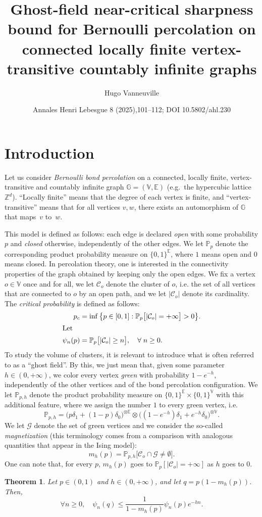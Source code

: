 \documentclass[10pt]{amsart}
\title[Ghost-field near-critical sharpness]{Ghost-field near-critical sharpness bound for Bernoulli percolation on connected locally finite vertex-transitive countably infinite graphs}
\author{Hugo Vanneuville}
\date{Annales Henri Lebesgue 8 (2025),101–112; DOI 10.5802/ahl.230}
\newtheorem{theo}{Theorem}[section]
\theoremstyle{definition}
\newcommand{\E}{\mathbb{E}}
\newcommand{\G}{\mathbb{G}}
\newcommand{\V}{\mathbb{V}}
\newcommand{\Z}{\mathbb{Z}}
\newcommand{\Pro}{\mathbb{P}}
\newcommand{\calC}{\mathcal{C}}
\newcommand{\calG}{\mathcal{G}}
\let\oldforall\forall
\renewcommand*{\forall}{\mathrel{\oldforall}}
\begin{document}
\maketitle
\section{Introduction}

Let us consider \emph{Bernoulli bond percolation} on a connected, locally finite, vertex-transitive and countably infinite graph $\G=(\V,\E)$ (e.g.\ the hypercubic lattice $\Z^d$). ``Locally finite'' means that the degree of each vertex is finite, and ``vertex-transitive'' means that for all vertices $v,w$, there exists an automorphism of $\G$ that maps~$v$ to~$w$.


This model is defined as follows: each edge is declared \emph{open} with some probability $p$ and \emph{closed} otherwise, independently of the other edges. We let $\Pro_p$ denote the corresponding product probability measure on $\{0,1\}^{\E}$, where $1$ means open and $0$ means closed. In percolation theory, one is interested in the connectivity properties of the graph obtained by keeping only the open edges. We fix a vertex $o \in \V$ once and for all, we let $\calC_o$ denote the cluster of $o$, i.e. the set of all vertices that are connected to $o$ by an open path, and we let $|\calC_o|$ denote its cardinality. The \emph{critical probability} is defined as follows:
\begin{align*}
p_c &= \inf \big\{ p \in [0,1] : \Pro_p\big[|\calC_o|=+\infty\big]>0 \big\}.
\\
\intertext{Let}
\psi_n(p) &= \Pro_p\big[|\calC_o| \ge n\big], \quad \forall n \ge 0.
\end{align*}
To study the volume of clusters, it is relevant to introduce what is often referred to as a ``ghost field''. By this, we just mean that, given some parameter $h \in (0,+\infty)$, we color every vertex \emph{green} with probability $1-e^{-h}$, independently of the other vertices and of the bond percolation configuration. We let $\Pro_{p,h}$ denote the product probability measure on $\{0,1\}^{\E} \times \{0,1\}^{\V}$ with this additional feature, where we assign the number $1$ to every green vertex, i.e.
\[
\Pro_{p,h} = \big(p\delta_1+(1-p)\delta_0\big)^{\otimes \E} \otimes \big((1-e^{-h})\delta_1+e^{-h}\delta_0\big)^{\otimes \V}.
\]
We let $\calG$ denote the set of green vertices and we consider the so-called \emph{magnetization} (this terminology comes from a comparison with analogous quantities that appear in the Ising model):
\[
m_h(p)=\Pro_{p,h} \big[\calC_o \cap \calG \ne \emptyset \big].
\]
One can note that, for every $p$, $m_h(p)$ goes to $\Pro_p[|\calC_o|=+\infty]$ as $h$ goes to $0$.
\setcounter{theo}{1}
\begin{theo}\label{thm:exp}
Let $p\in(0,1)$ and $h\in(0,+\infty)$, and let $q=p(1-m_h(p))$. Then,
\[
\forall n \ge 0, \quad \psi_n(q) \le \frac{1}{1-m_h(p)} \psi_n(p) e^{-hn}.
\]
\end{theo}
\setcounter{section}{2}
\end{document}
